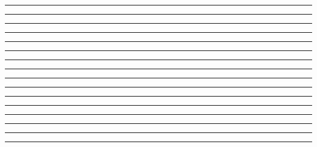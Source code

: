 \documentclass{article}
\begin{document}
\newpage
\noindent{}\rule{1cm}{0.025cm}\framebox{\rule{1cm}{1cm}}

\newpage
\noindent{}\rule{1cm}{0.025cm}

\newpage
\noindent{}\rule{1cm}{0.025cm}

\newpage
\noindent{}\rule{1cm}{0.025cm}

\newpage
\noindent{}\rule{1cm}{0.025cm}

\newpage
\noindent{}\rule{1cm}{0.025cm}

\newpage
\noindent{}\rule{1cm}{0.025cm}

\newpage
\noindent{}\rule{1cm}{0.025cm}

\newpage
\noindent{}\rule{1cm}{0.025cm}

\newpage
\noindent{}\rule{1cm}{0.025cm}

\newpage
\noindent{}\rule{1cm}{0.025cm}

\newpage
\noindent{}\rule{1cm}{0.025cm}

\newpage
\noindent{}\rule{1cm}{0.025cm}

\newpage
\noindent{}\rule{1cm}{0.025cm}

\newpage
\noindent{}\rule{1cm}{0.025cm}

\newpage
\noindent{}\rule{1cm}{0.025cm}
\end{document}
